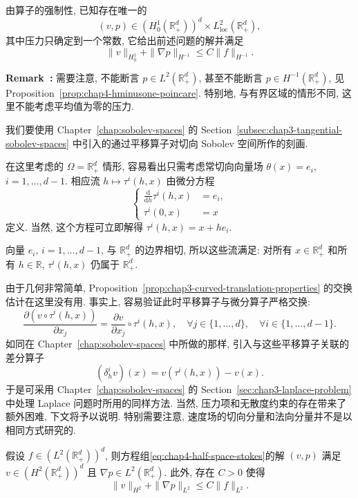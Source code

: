 由算子的强制性, 已知存在唯一的
\[
 (v,p)\in(H_0^1(\mathbb R_+^d))^d\times L_{\mathrm{loc}}^2(\mathbb R_+^d),
\]
其中压力只确定到一个常数, 它给出前述问题的解并满足
\begin{equation}
 \|v\|_{H_0^1}+\|\nabla p\|_{H^{-1}}\leq C\|f\|_{H^{-1}}.
 \label{eq:chap4-half-space-stokes-energy}
\end{equation}

\par\noindent{}\textbf{Remark~\thechapterfoursectionsixremark:}\label{rem:chap4-half-space-pressure}\quad
需要注意, 不能断言 $p\in L^2(\mathbb R_+^d)$, 甚至不能断言 $p\in H^{-1}(\mathbb R_+^d)$, 见 Proposition~\ref{prop:chap4-hminusone-poincare}. 特别地, 与有界区域的情形不同, 这里不能考虑平均值为零的压力.

我们要使用 Chapter~\ref{chap:sobolev-spaces} 的 Section~\ref{subsec:chap3-tangential-sobolev-spaces} 中引入的通过平移算子对切向 Sobolev 空间所作的刻画.

在这里考虑的 $\Omega=\mathbb R_+^d$ 情形, 容易看出只需考虑常切向向量场 $\theta(x)=e_i$, $i=1,\ldots,d-1$. 相应流 $h\mapsto\tau^i(h,x)$ 由微分方程
\[
 \left\{
 \begin{aligned}
  \frac{\mathrm d}{\mathrm dh}\tau^i(h,x)&=e_i,\\
  \tau^i(0,x)&=x
 \end{aligned}
 \right.
\]
定义. 当然, 这个方程可立即解得 $\tau^i(h,x)=x+he_i$.

向量 $e_i$, $i=1,\ldots,d-1$, 与 $\mathbb R_+^d$ 的边界相切, 所以这些流满足: 对所有 $x\in\mathbb R_+^d$ 和所有 $h\in\mathbb R$, $\tau^i(h,x)$ 仍属于 $\mathbb R_+^d$.

由于几何非常简单, Proposition~\ref{prop:chap3-curved-translation-properties} 的交换估计在这里没有用. 事实上, 容易验证此时平移算子与微分算子严格交换:
\[
 \frac{\partial(v\circ\tau^i(h,x))}{\partial x_j}
 =\frac{\partial v}{\partial x_j}\circ\tau^i(h,x),
 \quad\forall j\in\{1,\ldots,d\},\quad\forall i\in\{1,\ldots,d-1\}.
\]
如同在 Chapter~\ref{chap:sobolev-spaces} 中所做的那样, 引入与这些平移算子关联的差分算子
\[
 (\delta_h^iv)(x)=v(\tau^i(h,x))-v(x).
\]
于是可采用 Chapter~\ref{chap:sobolev-spaces} 的 Section~\ref{sec:chap3-laplace-problem} 中处理 Laplace 问题时所用的同样方法. 当然, 压力项和无散度约束的存在带来了额外困难, 下文将予以说明. 特别需要注意, 速度场的切向分量和法向分量并不是以相同方式研究的.

\begin{Proposition}
\label{prop:chap4-half-space-stokes-regularity}
假设 $f\in(L^2(\mathbb R_+^d))^d$, 则方程组\eqref{eq:chap4-half-space-stokes}的解 $(v,p)$ 满足 $v\in(H^2(\mathbb R_+^d))^d$ 且 $\nabla p\in L^2(\mathbb R_+^d)$. 此外, 存在 $C>0$ 使得
\[
 \|v\|_{H^2}+\|\nabla p\|_{L^2}\leq C\|f\|_{L^2}.
\]
\end{Proposition}

